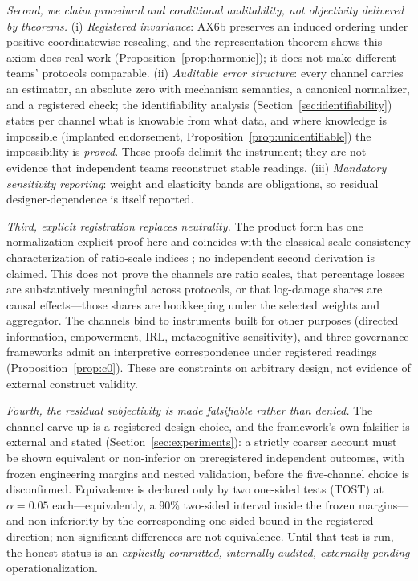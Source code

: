 \emph{Second, we claim procedural and conditional auditability, not
objectivity delivered by theorems.} (i) \emph{Registered invariance}: AX6b
preserves an induced ordering under positive coordinatewise rescaling, and
the representation theorem shows this axiom does real work
(Proposition~\ref{prop:harmonic}); it does not make different teams' protocols
comparable. (ii) \emph{Auditable error structure}: every channel carries an
estimator, an absolute zero with mechanism semantics, a canonical normalizer,
and a registered check; the identifiability analysis
(Section~\ref{sec:identifiability}) states per channel what is knowable from
what data, and where knowledge is impossible (implanted endorsement,
Proposition~\ref{prop:unidentifiable}) the impossibility is \emph{proved}.
These proofs delimit the instrument; they are not evidence that independent
teams reconstruct stable readings. (iii) \emph{Mandatory sensitivity
reporting}: weight and elasticity bands are obligations, so residual
designer-dependence is itself reported.

\emph{Third, explicit registration replaces neutrality.} The product form
has one normalization-explicit proof here and coincides with the classical
scale-consistency characterization of ratio-scale indices
\citep{ebert_welsch2004}; no independent second derivation is claimed. This
does not prove the channels are ratio scales, that percentage losses are
substantively meaningful across protocols, or that log-damage shares are
causal effects---those shares are bookkeeping under the selected weights and
aggregator. The channels bind to instruments built for other purposes
(directed information, empowerment, IRL, metacognitive sensitivity), and
three governance frameworks admit an interpretive correspondence under
registered readings (Proposition~\ref{prop:c0}). These are constraints on
arbitrary design, not evidence of external construct validity.

\emph{Fourth, the residual subjectivity is made falsifiable rather than
denied.} The channel carve-up is a registered design choice, and the
framework's own falsifier is external and stated
(Section~\ref{sec:experiments}): a strictly coarser account must be shown
equivalent or non-inferior on preregistered independent outcomes, with frozen
engineering margins and nested validation, before the five-channel choice is
disconfirmed. Equivalence is declared only by two one-sided tests (TOST) at
$\alpha=0.05$ each---equivalently, a 90\% two-sided interval inside the frozen
margins---and non-inferiority by the corresponding one-sided bound in the
registered direction; non-significant differences are not equivalence. Until
that test is run, the honest status is an \emph{explicitly committed,
internally audited, externally pending} operationalization.

